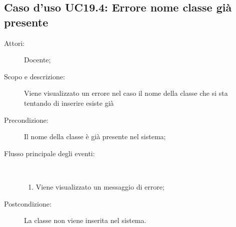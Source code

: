 \subsection{Caso d'uso UC19.4: Errore nome classe già presente}\begin{description}
	\item[Attori:] Docente;
	\item[Scopo e descrizione:] Viene visualizzato un errore nel caso il nome della classe che si sta tentando di inserire esiste già
	\item[Precondizione:] Il nome della classe è già presente nel sistema;
	
	\item[Flusso principale degli eventi:] \ 
	\begin{enumerate}
		\item Viene visualizzato un messaggio di errore;
		
	\end{enumerate}
	\item[Postcondizione:] La classe non viene inserita nel sistema.
\end{description}
\hypertarget{UC20}{}
